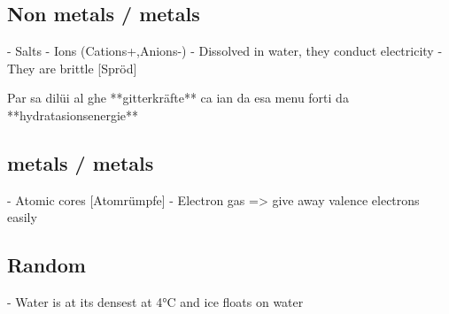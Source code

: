 \subsection{Non metals / metals}
- Salts
- Ions (Cations+,Anions-)
- Dissolved in water, they conduct electricity
- They are brittle [Spröd]

Par sa dilüi al ghe **gitterkräfte** ca ian da esa menu forti da **hydratasionsenergie**

\subsection{metals / metals}
- Atomic cores [Atomrümpfe]
- Electron gas => give away valence electrons easily

\subsection{Random}
- Water is at its densest at 4°C and ice floats on water
